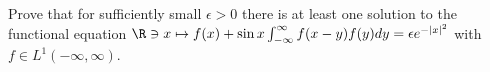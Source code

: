 Prove that for sufficiently small $\epsilon>0$ there is at least one
solution to the functional equation $\R\ni x\mapsto f(x)+\sin
x\int_{-\infty}^{\infty}f(x-y)f(y)dy=\epsilon e^{-|x|^2}$ with 
$f\in L^1(-\infty,\infty)$. 
